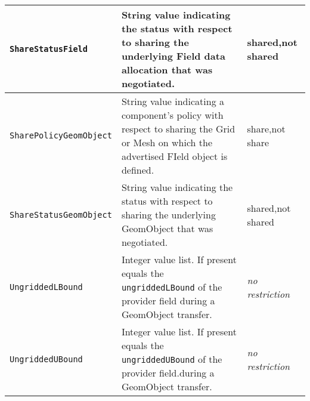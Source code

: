 \begin{longtable}{|p{}|p{}|p{}|}
     {\tt ShareStatusField} & String value indicating the status with respect to sharing the underlying Field data allocation that was negotiated.& shared,\newline not shared\\ \hline
     {\tt SharePolicyGeomObject} & String value indicating a component's policy with respect to sharing the Grid or Mesh on which the advertised FIeld object is defined.& share,\newline not share\\ \hline
     {\tt ShareStatusGeomObject} & String value indicating the status with respect to sharing the underlying GeomObject that was negotiated.& shared,\newline not shared\\ \hline
     {\tt UngriddedLBound} & Integer value list. If present equals the {\tt ungriddedLBound} of the provider field during a GeomObject transfer. & {\em no restriction}\\ \hline
     {\tt UngriddedUBound} & Integer value list. If present equals the {\tt ungriddedUBound} of the provider field.during a GeomObject transfer. & {\em no restriction}\\ \hline
     \hline
\end{longtable}
